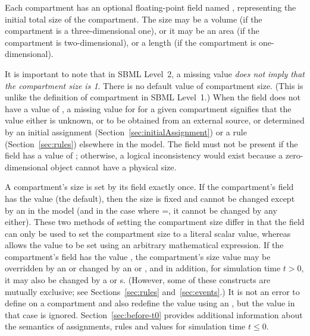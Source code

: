 Each compartment has an optional floating-point field named
, representing the initial total size of the
compartment.  The size may be a volume (if the compartment is a
three-dimensional one), or it may be an area (if the compartment
is two-dimensional), or a length (if the compartment is
one-dimensional).

It is important to note that in SBML Level~2, a missing
 value \emph{does not imply that the compartment size
  is 1}.  There is no default value of compartment size.  (This is
unlike the definition of compartment  in SBML
Level~1.)  When the  field does not have
a value of , a missing value for  for a given
compartment signifies that the value either is unknown, or to be
obtained from an external source, or determined by an initial
assignment (Section~\ref{sec:initialAssignment}) or a rule
(Section~\ref{sec:rules}) elsewhere in the model.  The
 field must not be present if the
 field has a value of ; otherwise,
a logical inconsistency would exist because a zero-dimensional
object cannot have a physical size.

A compartment's size is set by its  field exactly
once.  If the compartment's  field has the value
 (the default), then the size is fixed and cannot be
changed except by an \InitialAssignment in the model (and in the
case where =, it cannot be changed
by any \InitialAssignment either).  These two methods of setting
the compartment size differ in that the  field can
only be used to set the compartment size to a literal scalar
value, whereas \InitialAssignment allows the value to be set using
an arbitrary mathematical expression.  If the compartment's
 field has the value , the
compartment's size value may be overridden by an
\InitialAssignment or changed by an \AssignmentRule or
\AlgebraicRule, and in addition, for simulation time $t > 0$, it
may also be changed by a \RateRule or \Event{}s.  (However, some
of these constructs are mutually exclusive; see
Sections~\ref{sec:rules} and~\ref{sec:events}.)  It is not an
error to define  on a compartment and also redefine
the value using an \InitialAssignment, but the  value
in that case is ignored.  Section~\ref{sec:before-t0} provides
additional information about the semantics of assignments, rules
and values for simulation time $t \leq 0$.

